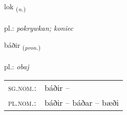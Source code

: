 \documentclass[frontgrid, backgrid]{flacards}\usepackage[]{graphicx}\usepackage[]{xcolor}
\begin{document}
\renewcommand{\flhead}{\vskip5pt \fboxsep=0pt {\small\bfseries\footnotesize Nafnorð | rzeczownik}}
\renewcommand{\fcfoot}{\vskip5pt \fboxsep=0pt \hspace{2pt}{\small\bfseries\footnotesize 1K}}

\renewcommand{\blhead}{\vskip5pt {\small\bfseries\footnotesize Nafnorð | rzeczownik }}
\renewcommand{\bcfoot}{\vskip5pt \hspace{2pt}{\small\bfseries\footnotesize 1K}}


{lok \small{\textsubscript{(\textit{n.})}} \\[1ex] %
\textphonetic{[lɔːk]} \\
pl.: \emph{pokrywkan; koniec} \\  [2ex]
\renewcommand*{\arraystretch}{0.8}
}

\renewcommand{\flhead}{\vskip5pt \fboxsep=0pt {\small\bfseries\footnotesize Fornafn | zaimek}}
\renewcommand{\fcfoot}{\vskip5pt \fboxsep=0pt \hspace{2pt}{\small\bfseries\footnotesize 1K}}

\renewcommand{\blhead}{\vskip5pt {\small\bfseries\footnotesize Fornafn | zaimek }}
\renewcommand{\bcfoot}{\vskip5pt \hspace{2pt}{\small\bfseries\footnotesize 1K}}


{báðir \small{\textsubscript{(\textit{pron.})}} \\[1ex] %
\textphonetic{[pauːðɪr]} \\
pl.: \emph{obaj} \\  [2ex]
\renewcommand*{\arraystretch}{0.8}
\begin{tabular}{ll}
\textsc{sg.nom.}: & báðir  -- \\ 
\textsc{pl.nom.}: & báðir -- báðar -- bæði
\end{tabular}
}
\end{document}
